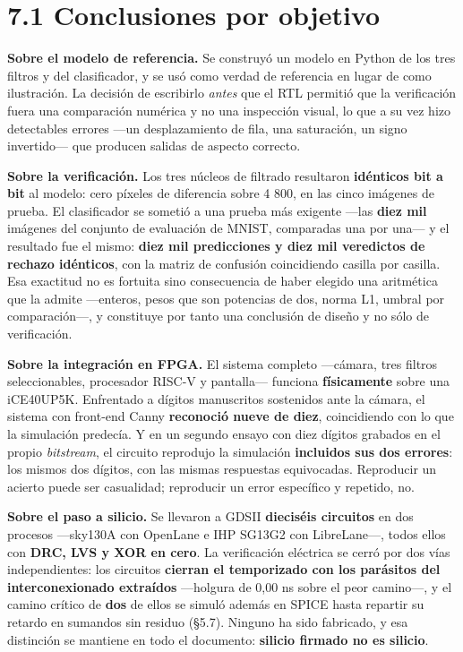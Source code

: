 \section{7.1 Conclusiones por objetivo}\label{conclusiones-por-objetivo}

\textbf{Sobre el modelo de referencia.} Se construyó un modelo en Python
de los tres filtros y del clasificador, y se usó como verdad de
referencia en lugar de como ilustración. La decisión de escribirlo
\emph{antes} que el RTL permitió que la verificación fuera una
comparación numérica y no una inspección visual, lo que a su vez hizo
detectables errores ---un desplazamiento de fila, una saturación, un
signo invertido--- que producen salidas de aspecto correcto.

\textbf{Sobre la verificación.} Los tres núcleos de filtrado resultaron
\textbf{idénticos bit a bit} al modelo: cero píxeles de diferencia sobre
4 800, en las cinco imágenes de prueba. El clasificador se sometió a una
prueba más exigente ---las \textbf{diez mil} imágenes del conjunto de
evaluación de MNIST, comparadas una por una--- y el resultado fue el
mismo: \textbf{diez mil predicciones y diez mil veredictos de rechazo
idénticos}, con la matriz de confusión coincidiendo casilla por casilla.
Esa exactitud no es fortuita sino consecuencia de haber elegido una
aritmética que la admite ---enteros, pesos que son potencias de dos,
norma L1, umbral por comparación---, y constituye por tanto una
conclusión de diseño y no sólo de verificación.

\textbf{Sobre la integración en FPGA.} El sistema completo ---cámara,
tres filtros seleccionables, procesador RISC-V y pantalla--- funciona
\textbf{físicamente} sobre una iCE40UP5K. Enfrentado a dígitos
manuscritos sostenidos ante la cámara, el sistema con front-end Canny
\textbf{reconoció nueve de diez}, coincidiendo con lo que la simulación
predecía. Y en un segundo ensayo con diez dígitos grabados en el propio
\emph{bitstream}, el circuito reprodujo la simulación \textbf{incluidos
sus dos errores}: los mismos dos dígitos, con las mismas respuestas
equivocadas. Reproducir un acierto puede ser casualidad; reproducir un
error específico y repetido, no.

\textbf{Sobre el paso a silicio.} Se llevaron a GDSII \textbf{dieciséis
circuitos} en dos procesos ---sky130A con OpenLane e IHP SG13G2 con
LibreLane---, todos ellos con \textbf{DRC, LVS y XOR en cero}. La
verificación eléctrica se cerró por dos vías independientes: los
circuitos \textbf{cierran el temporizado con los parásitos del
interconexionado extraídos} ---holgura de 0,00 ns sobre el peor
camino---, y el camino crítico de \textbf{dos} de ellos se simuló además
en SPICE hasta repartir su retardo en sumandos sin residuo (§5.7).
Ninguno ha sido fabricado, y esa distinción se mantiene en todo el
documento: \textbf{silicio firmado no es silicio}.


